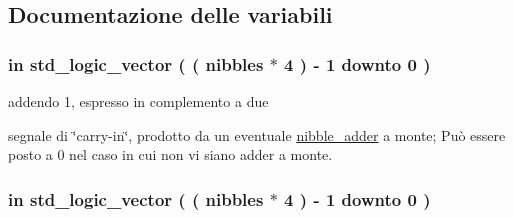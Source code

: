 \subsection{Documentazione delle variabili}
\subsubsection[{\texorpdfstring{addendum1}{addendum1}}]{ {\bfseries \textcolor{vhdlchar}{in}\textcolor{vhdlchar}{ }} {\bfseries \textcolor{vhdlchar}{std\+\_\+logic\+\_\+vector}\textcolor{vhdlchar}{ }\textcolor{vhdlchar}{(}\textcolor{vhdlchar}{ }\textcolor{vhdlchar}{(}\textcolor{vhdlchar}{ }\textcolor{vhdlchar}{ }\textcolor{vhdlchar}{ }\textcolor{vhdlchar}{ }{\bfseries {\bf nibbles}} \textcolor{vhdlchar}{$\ast$}\textcolor{vhdlchar}{ } \textcolor{vhdldigit}{4} \textcolor{vhdlchar}{ }\textcolor{vhdlchar}{)}\textcolor{vhdlchar}{ }\textcolor{vhdlchar}{-\/}\textcolor{vhdlchar}{ } \textcolor{vhdldigit}{1} \textcolor{vhdlchar}{ }\textcolor{vhdlchar}{downto}\textcolor{vhdlchar}{ }\textcolor{vhdlchar}{ } \textcolor{vhdldigit}{0} \textcolor{vhdlchar}{ }\textcolor{vhdlchar}{)}\textcolor{vhdlchar}{ }} \hspace{0.3cm}{\ttfamily [Port]}}\hypertarget{group___carry_loockahead_gae4a2e124144a2f35270a55f0cf32a5ee}{}\label{group___carry_loockahead_gae4a2e124144a2f35270a55f0cf32a5ee}


addendo 1, espresso in complemento a due 

segnale di \char`\"{}carry-\/in\char`\"{}, prodotto da un eventuale \hyperlink{classnibble__adder}{nibble\+\_\+adder} a monte; Può essere posto a \textquotesingle{}0\textquotesingle{} nel caso in cui non vi siano adder a monte. 
\subsubsection[{\texorpdfstring{addendum2}{addendum2}}]{ {\bfseries \textcolor{vhdlchar}{in}\textcolor{vhdlchar}{ }} {\bfseries \textcolor{vhdlchar}{std\+\_\+logic\+\_\+vector}\textcolor{vhdlchar}{ }\textcolor{vhdlchar}{(}\textcolor{vhdlchar}{ }\textcolor{vhdlchar}{(}\textcolor{vhdlchar}{ }\textcolor{vhdlchar}{ }\textcolor{vhdlchar}{ }\textcolor{vhdlchar}{ }{\bfseries {\bf nibbles}} \textcolor{vhdlchar}{$\ast$}\textcolor{vhdlchar}{ } \textcolor{vhdldigit}{4} \textcolor{vhdlchar}{ }\textcolor{vhdlchar}{)}\textcolor{vhdlchar}{ }\textcolor{vhdlchar}{-\/}\textcolor{vhdlchar}{ } \textcolor{vhdldigit}{1} \textcolor{vhdlchar}{ }\textcolor{vhdlchar}{downto}\textcolor{vhdlchar}{ }\textcolor{vhdlchar}{ } \textcolor{vhdldigit}{0} \textcolor{vhdlchar}{ }\textcolor{vhdlchar}{)}\textcolor{vhdlchar}{ }} \hspace{0.3cm}{\ttfamily [Port]}}\hypertarget{group___carry_loockahead_ga2715463c615cf8418f85c6a1427ce62c}{}\label{group___carry_loockahead_ga2715463c615cf8418f85c6a1427ce62c}


